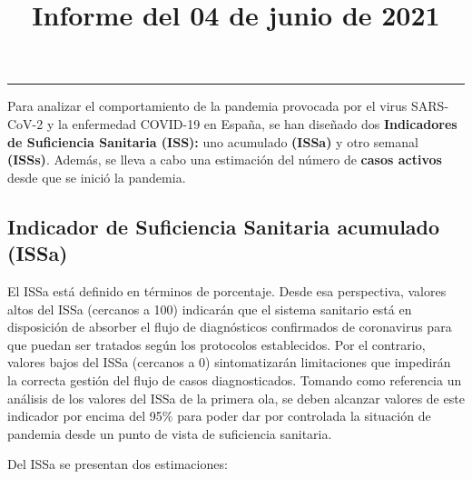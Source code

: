 \documentclass[
  11pt,
]{article}
\title{Informe del 04 de junio de 2021}
\author{}
\date{\vspace{-2.5em}}
\begin{document}
\maketitle

\renewcommand{\figurename}{Figura}
\renewcommand{\tablename}{Tabla}

\tableofcontents

\vspace{.5cm}

\begin{center}\rule{0.5\linewidth}{0.5pt}\end{center}

\vspace{.5cm}

Para analizar el comportamiento de la pandemia provocada por el virus
SARS-CoV-2 y la enfermedad COVID-19 en España, se han diseñado dos
\textbf{Indicadores de Suficiencia Sanitaria (ISS):} uno acumulado
\textbf{(ISSa)} y otro semanal \textbf{(ISSs)}. Además, se lleva a cabo
una estimación del número de \textbf{casos activos} desde que se inició
la pandemia.

\hypertarget{indicador-de-suficiencia-sanitaria-acumulado-issa}{%
\subsection{Indicador de Suficiencia Sanitaria acumulado
(ISSa)}\label{indicador-de-suficiencia-sanitaria-acumulado-issa}}

El ISSa está definido en términos de porcentaje. Desde esa perspectiva,
valores altos del ISSa (cercanos a 100) indicarán que el sistema
sanitario está en disposición de absorber el flujo de diagnósticos
confirmados de coronavirus para que puedan ser tratados según los
protocolos establecidos. Por el contrario, valores bajos del ISSa
(cercanos a 0) sintomatizarán limitaciones que impedirán la correcta
gestión del flujo de casos diagnosticados. Tomando como referencia un
análisis de los valores del ISSa de la primera ola, se deben alcanzar
valores de este indicador por encima del 95\% para poder dar por
controlada la situación de pandemia desde un punto de vista de
suficiencia sanitaria.

Del ISSa se presentan dos estimaciones:
\end{document}
